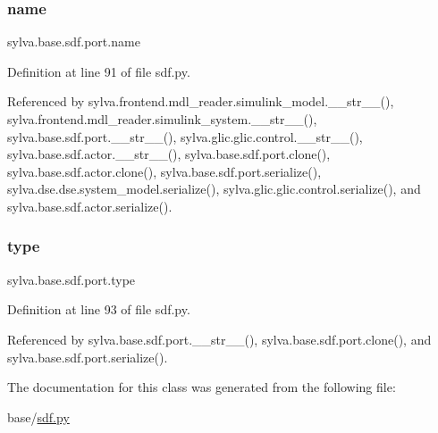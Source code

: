 \mbox{\label{classsylva_1_1base_1_1sdf_1_1port_ace0eb23bb9f3e4a75e6a94f0961a6f99}} 
\subsubsection{\texorpdfstring{name}{name}}
{\footnotesize\ttfamily sylva.\+base.\+sdf.\+port.\+name}



Definition at line 91 of file sdf.\+py.



Referenced by sylva.\+frontend.\+mdl\+\_\+reader.\+simulink\+\_\+model.\+\_\+\+\_\+str\+\_\+\+\_\+(), sylva.\+frontend.\+mdl\+\_\+reader.\+simulink\+\_\+system.\+\_\+\+\_\+str\+\_\+\+\_\+(), sylva.\+base.\+sdf.\+port.\+\_\+\+\_\+str\+\_\+\+\_\+(), sylva.\+glic.\+glic.\+control.\+\_\+\+\_\+str\+\_\+\+\_\+(), sylva.\+base.\+sdf.\+actor.\+\_\+\+\_\+str\+\_\+\+\_\+(), sylva.\+base.\+sdf.\+port.\+clone(), sylva.\+base.\+sdf.\+actor.\+clone(), sylva.\+base.\+sdf.\+port.\+serialize(), sylva.\+dse.\+dse.\+system\+\_\+model.\+serialize(), sylva.\+glic.\+glic.\+control.\+serialize(), and sylva.\+base.\+sdf.\+actor.\+serialize().

\mbox{\label{classsylva_1_1base_1_1sdf_1_1port_af04b13138d55895bfd1083eb3e772f58}} 
\subsubsection{\texorpdfstring{type}{type}}
{\footnotesize\ttfamily sylva.\+base.\+sdf.\+port.\+type}



Definition at line 93 of file sdf.\+py.



Referenced by sylva.\+base.\+sdf.\+port.\+\_\+\+\_\+str\+\_\+\+\_\+(), sylva.\+base.\+sdf.\+port.\+clone(), and sylva.\+base.\+sdf.\+port.\+serialize().



The documentation for this class was generated from the following file\+:\begin{DoxyCompactItemize}
\item 
base/\hyperlink{sdf_8py}{sdf.\+py}\end{DoxyCompactItemize}
